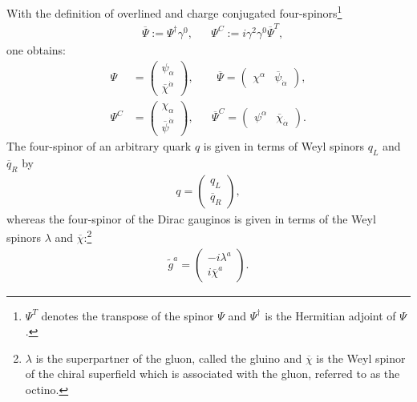  
With the definition of overlined and charge conjugated four-spinors\footnote{$\Psi^T$ denotes the transpose of the spinor $\Psi$ and $\Psi^\dagger$ is the Hermitian adjoint of $\Psi$.}
\begin{align}
&\overline{\Psi} := \Psi^\dagger \gamma^0, && \Psi^C := i\gamma^2\gamma^0 \overline{\Psi}^T, 
\end{align}
one obtains:
\begin{align}
\Psi &= \begin{pmatrix}
\psi_\alpha \\
\overline{\chi}^{\dot{\alpha}}
\end{pmatrix}, && \ \ 
\overline{\Psi} = \begin{pmatrix}
\chi^\alpha & \overline{\psi}_{\dot{\alpha}}
\end{pmatrix},\nonumber\\
\Psi^C &= \begin{pmatrix}
\chi_\alpha \\
\overline{\psi}^{\dot{\alpha}}
\end{pmatrix}, && 
\overline{\Psi}^C = \begin{pmatrix}
\psi^\alpha & \overline{\chi}_{\dot{\alpha}}
\end{pmatrix}.
\end{align}
The four-spinor of an arbitrary quark $q$ is given in terms of Weyl spinors $q_L$ and $\overline{q}_R$ by
\begin{align}
q = \begin{pmatrix}
q_L \\
\overline{q}_R
\end{pmatrix},
\end{align}
whereas the four-spinor of the Dirac gauginos is given in terms of the Weyl spinors $\lambda$ and $\overline{\chi}$:\footnote{$\lambda$ is the superpartner of the gluon, called the gluino and $\overline{\chi}$ is the Weyl spinor of the chiral superfield which is associated with the gluon, referred to as the octino.}
\begin{align}
\tilde{g}^a = \begin{pmatrix}
-i \lambda^a \\
i \overline{\chi}^a
\end{pmatrix}.
\end{align}

